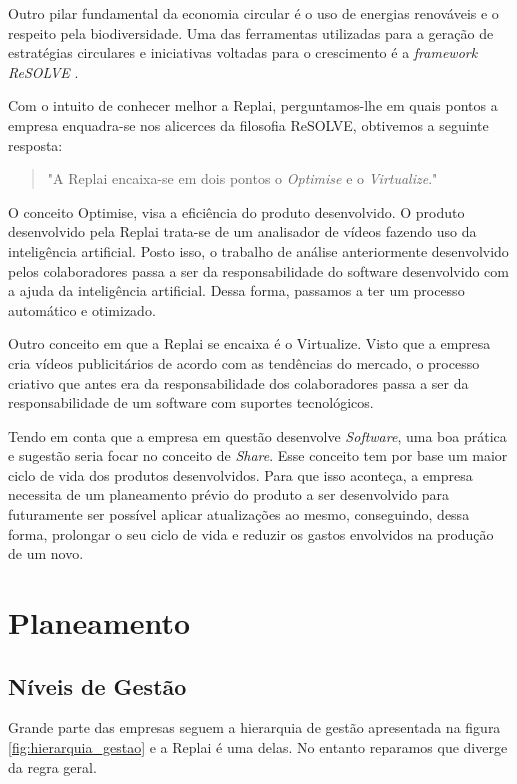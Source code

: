 Outro pilar fundamental da economia circular é o uso de energias renováveis e o respeito pela biodiversidade. Uma das ferramentas utilizadas para a geração de estratégias circulares e iniciativas voltadas para o crescimento é a \textit{framework ReSOLVE} \cite{EconomiaCircular1}. 

Com o intuito de conhecer melhor a Replai, perguntamos-lhe em quais pontos a empresa enquadra-se nos alicerces da filosofia ReSOLVE, obtivemos a seguinte resposta:\begin{quote}
"A Replai encaixa-se em dois pontos o \textit{Optimise} e o \textit{Virtualize}."\end{quote}

O conceito Optimise, visa a eficiência do produto desenvolvido. O produto desenvolvido pela Replai trata-se de um analisador de vídeos fazendo uso da inteligência artificial. Posto isso, o trabalho de análise anteriormente desenvolvido pelos colaboradores passa a ser da responsabilidade do software desenvolvido com a ajuda da inteligência artificial. Dessa forma, passamos a ter um processo automático e otimizado. 

Outro conceito em que a Replai se encaixa é o Virtualize. Visto que a empresa cria vídeos publicitários de acordo com as tendências do mercado, o processo criativo que antes era da responsabilidade dos colaboradores passa a ser da responsabilidade de um software com suportes tecnológicos. 

Tendo em conta que a empresa em questão desenvolve \textit{Software}, uma boa prática e sugestão seria focar no conceito de \textit{Share}. Esse conceito tem por base um maior ciclo de vida dos produtos desenvolvidos. Para que isso aconteça, a empresa necessita de um planeamento prévio do produto a ser desenvolvido para futuramente ser possível aplicar atualizações ao mesmo, conseguindo, dessa forma, prolongar o seu ciclo de vida e reduzir os gastos envolvidos na produção de um novo.

\section{Planeamento}
\subsection{Níveis de Gestão}
    Grande parte das empresas seguem a hierarquia de gestão apresentada na figura \ref{fig:hierarquia_gestao} e a Replai é uma delas. No entanto reparamos que diverge da regra geral.

